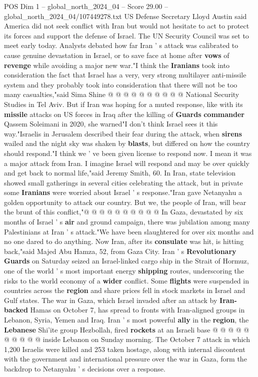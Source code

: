 \begin{textsample}{POS Dim 1 – global\_north\_2024\_04 – Score 29.00 – global\_north\_2024\_04/107449278.txt}
US Defense Secretary Lloyd Austin said America did not seek conflict with Iran but would not hesitate to act to protect its forces and support the defense of Israel.
The UN Security Council was set to meet early today.
Analysts debated how far Iran ' s attack was calibrated to cause genuine devastation in Israel, or to save face at home after \textbf{vows} of \textbf{revenge} while avoiding a major new war."I think the \textbf{Iranians} took into consideration the fact that Israel has a very, very strong multilayer anti-missile system and they probably took into consideration that there will not be too many casualties,"said Sima Shine @ @ @ @ @ @ @ @ @ @ National Security Studies in Tel Aviv.
But if Iran was hoping for a muted response, like with its \textbf{missile} attacks on US forces in Iraq after the killing of \textbf{Guards} \textbf{commander} Qassem Soleimani in 2020, she warned"I don't think Israel sees it this way."Israelis in Jerusalem described their fear during the attack, when \textbf{sirens} wailed and the night sky was shaken by \textbf{blasts}, but differed on how the country should respond."I think we ' ve been given license to respond now.
I mean it was a major attack from Iran.
I imagine Israel will respond and may be over quickly and get back to normal life,"said Jeremy Smith, 60.
In Iran, state television showed small gatherings in several cities celebrating the attack, but in private some \textbf{Iranians} were worried about Israel ' s response."Iran gave Netanyahu a golden opportunity to attack our country.
But we, the people of Iran, will bear the brunt of this conflict,"@ @ @ @ @ @ @ @ @ @ In Gaza, devastated by six months of Israel ' s \textbf{air} and ground campaign, there was jubilation among many Palestinians at Iran ' s attack."We have been slaughtered for over six months and no one dared to do anything.
Now Iran, after its \textbf{consulate} was hit, is hitting back,"said Majed Abu Hamza, 52, from Gaza City.
Iran ' s \textbf{Revolutionary} \textbf{Guards} on Saturday seized an Israel-linked cargo ship in the Strait of Hormuz, one of the world ' s most important energy \textbf{shipping} routes, underscoring the risks to the world economy of a \textbf{wider} conflict.
Some \textbf{flights} were suspended in countries across the \textbf{region} and share prices fell in stock markets in Israel and Gulf states.
The war in Gaza, which Israel invaded after an attack by \textbf{Iran-backed} Hamas on October 7, has spread to fronts with Iran-aligned groups in Lebanon, Syria, Yemen and Iraq.
Iran ' s most powerful \textbf{ally} in the \textbf{region}, the \textbf{Lebanese} Shi'ite group Hezbollah, fired \textbf{rockets} at an Israeli base @ @ @ @ @ @ @ @ @ @ inside Lebanon on Sunday morning.
The October 7 attack in which 1,200 Israelis were killed and 253 taken hostage, along with internal discontent with the government and international pressure over the war in Gaza, form the backdrop to Netanyahu ' s decisions over a response.


\end{textsample}

